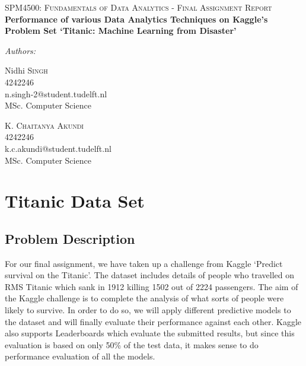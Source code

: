 \documentclass[a4paper,10pt]{report}
\date{\today}
\begin{document}



\begin{titlepage}
\begin{center}

\textsc{\Large SPM4500: Fundamentals of Data Analytics - Final Assignment Report }\\[6cm]

{ \bfseries \Large Performance of various Data Analytics Techniques on Kaggle's Problem Set `Titanic: Machine Learning from Disaster' \\[6cm] }

\begin{minipage}{0.6\textwidth}
\emph{Authors:}\\
\begin{flushleft} \large
Nidhi \textsc{Singh}\\
4242246 \\
n.singh-2@student.tudelft.nl\\
MSc. Computer Science\\
\end{flushleft}

\begin{flushright} \large
K. \textsc{Chaitanya Akundi}\\
4242246 \\
k.c.akundi@student.tudelft.nl\\
MSc. Computer Science\\
\end{flushright}

\end{minipage}

\end{center}
\end{titlepage}

\listoffigures

\chapter{Titanic Data Set}
\section{Problem Description}
For our final assignment, we have taken up a challenge from Kaggle `Predict survival on the Titanic'. The dataset includes details of people who travelled on RMS Titanic which sank in 1912 killing 1502 out of 2224 passengers.
The aim of the Kaggle challenge is to complete the analysis of what sorts of people were likely to survive. In order to do so, we will apply different predictive models to the dataset and will finally evaluate their performance against each other. Kaggle also supports Leaderboards which evaluate the submitted results, but since this evaluation is based on only 50\% of the test data, it makes sense to do performance evaluation of all the models.
\end{document}
